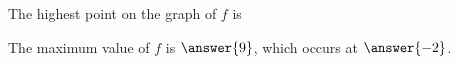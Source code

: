 \documentclass{ximera}
\begin{document}
\begin{example}
\begin{question}

The highest point on the graph of $f$ is


\begin{multipleChoice}
\end{multipleChoice}
\end{question}


\begin{question}
The maximum value of $f$ is $\answer{9}$, which occurs at $\answer{-2}$.
\end{question}







\end{example}
\end{document}
